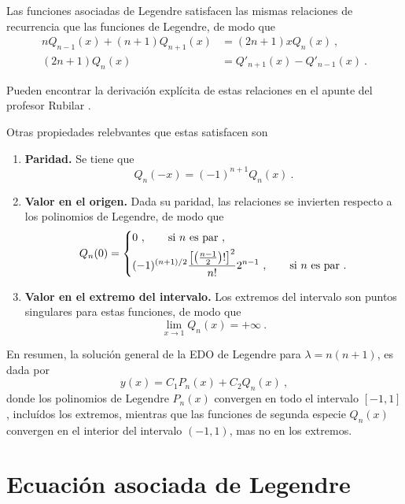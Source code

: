 Las funciones asociadas de Legendre satisfacen las mismas relaciones de recurrencia que las funciones de Legendre, de modo que
\begin{align}
    nQ_{n-1}(x) + (n+1)Q_{n+1}(x) & = (2n+1) x Q_n(x) \ , \\
    (2n+1)Q_n(x) & = Q'_{n+1}(x) - Q'_{n-1}(x) \ . 
\end{align}

Pueden encontrar la derivación explícita de estas relaciones en el apunte del profesor Rubilar \cite{Rubilar}.

Otras propiedades relebvantes que estas satisfacen son
\begin{enumerate}
    \item \textbf{Paridad.} Se tiene que
    \begin{equation}
        Q_n(-x) = (-1)^{n+1} Q_n(x) \ .
    \end{equation}
    \item \textbf{Valor en el origen.} Dada su paridad, las relaciones se invierten respecto a los polinomios de Legendre, de modo que
    \begin{equation}
        Q_n(0) = \begin{dcases}
            0 \ , \qquad \text{si } n \text{ es par} \ , \\
            (-1)^{(n+1)/2} \frac{\left[ \left( \frac{n-1}{2} \right)! \right]^2}{n!} 2^{n-1} \ , \qquad \text{si } n \text{ es par} \ .  
        \end{dcases}
    \end{equation}
    \item \textbf{Valor en el extremo del intervalo.} Los extremos del intervalo son puntos singulares para estas funciones, de modo que
    \begin{equation}
        \lim_{x \to 1} Q_n(x) = +\infty \ .
    \end{equation}
\end{enumerate} 

En resumen, la solución general de la EDO de Legendre para $\lambda = n(n+1)$, es dada por
\begin{equation}
    y(x) = C_1 P_n(x) + C_2 Q_n(x) \ ,
\end{equation}
donde los polinomios de Legendre $P_n(x)$ convergen en todo el intervalo $[-1,1]$, incluídos los extremos, mientras que las funciones de segunda especie $Q_n(x)$ convergen en el interior del intervalo $(-1,1)$, mas no en los extremos.

\section{Ecuación asociada de Legendre}

